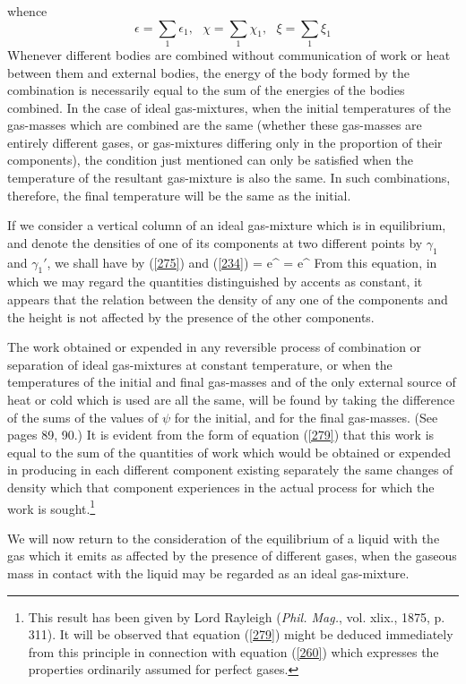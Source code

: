 \documentclass[12pt]{article}
\begin{document}
whence        $$\epsilon = \sum_1 \epsilon_1, \ \ \ \chi = \sum_1 \chi_1,\ \ \ \xi = \sum_1 \xi_1$$
Whenever different bodies are combined without communication of work or heat between them and external bodies, the energy of the body formed by the combination is necessarily equal to the sum of the energies of the bodies combined. In the case of ideal gas-mixtures, when the initial temperatures of the gas-masses which are combined are the same (whether these gas-masses are entirely different gases, or gas-mixtures differing only in the proportion of their components), the condition just mentioned can only be satisfied when the temperature of the resultant gas-mixture is also the same.  In such combinations, therefore, the final temperature will be the same as the initial.


If we consider a vertical column of an ideal gas-mixture which is
in equilibrium, and denote the densities of one of its components at two different points by $\gamma_1$ and $\gamma_1'$, we shall have by (\ref{275}) and (\ref{234})
\eqs {} = e^{} = e^{}    \label{284}\eqe
From this equation, in which we may regard the quantities distinguished by accents as constant, it appears that the relation between the density of any one of the components and the height is not affected by the presence of the other components.


The work obtained or expended in any reversible process of combination or separation of ideal gas-mixtures at constant temperature, or when the temperatures of the initial and final gas-masses and of the only external source of heat or cold which is used are all the same, will be found by taking the difference of the sums of the values of $\psi$ for the initial, and for the final gas-masses. (See pages 89, 90.) It is evident from the form of equation (\ref{279}) that this work is equal to the sum of the quantities of work which would be obtained or expended in producing in each different component existing separately the same changes of density which that component experiences in the actual process for which the work is sought.\footnote{This result has been given by Lord Rayleigh (\textit{Phil. Mag.}, vol. xlix., 1875, p. 311). It will be observed that equation (\ref{279}) might be deduced immediately from this principle in connection with equation (\ref{260}) which expresses the properties ordinarily assumed for perfect gases.}


We will now return to the consideration of the equilibrium of a liquid with the gas which it emits as affected by the presence of different gases, when the gaseous mass in contact with the liquid may be regarded as an ideal gas-mixture.
\end{document}
